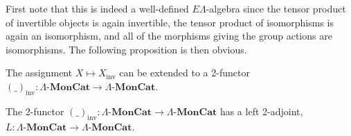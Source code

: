\documentclass{amsbook} %
\newcommand{\mb}{\mathbf}
\newcommand{\ELAlg}{\lmc}
\newcommand{\lmc}{\Lambda\mbox{-}\mb{MonCat}}
\numberwithin{section}{chapter}
\begin{document}
First note that this is indeed a well-defined $E\Lambda$-algebra since the tensor product of invertible objects is again invertible, the tensor product of isomorphisms is again an isomorphism, and all of the morphisms giving the group actions are isomorphisms. The following proposition is then obvious.


\begin{prop} \label{invprop} The assignment $X \mapsto X_{\mathrm{inv}}$ can be extended to a 2-functor $(\_)_{\mathrm{inv}} \colon  \ELAlg \to \ELAlg$.
\end{prop}


\begin{prop} \label{invadj} The 2-functor $(\_)_{\mathrm{inv}} \colon  \ELAlg \to \ELAlg$ has a left 2-adjoint, $L \colon  \ELAlg \to \ELAlg$.
\end{prop}
\end{document}
